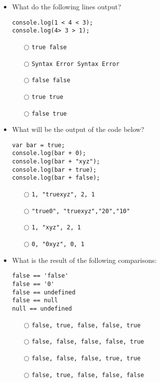 \documentclass[10pt,twocolumn]{article}
\begin{document}
\begin{itemize}
    \item What do the following lines output?
          \begin{verbatim}
console.log(1 < 4 < 3);
console.log(4> 3 > 1);
\end{verbatim}
          \begin{itemize}
              \item[$\bigcirc$] \verb=true false=
              \item[$\bigcirc$] \verb=Syntax Error Syntax Error=
              \item[$\bigcirc$] \verb=false false=
              \item[$\bigcirc$] \verb=true true=
              \item[$\bigcirc$] \verb=false true=
          \end{itemize}
\end{itemize}
\begin{itemize}
    \item What will be the output of the code below?
          \begin{verbatim}
var bar = true;
console.log(bar + 0);
console.log(bar + "xyz");
console.log(bar + true);
console.log(bar + false);
\end{verbatim}
          \begin{itemize}
              \item[$\bigcirc$] \verb=1, "truexyz", 2, 1=
              \item[$\bigcirc$] \verb="true0", "truexyz","20","10"=
              \item[$\bigcirc$] \verb=1, "xyz", 2, 1=
              \item[$\bigcirc$] \verb=0, "0xyz", 0, 1=
          \end{itemize}
\end{itemize}
\begin{itemize}
    \item What is the result of the following comparisons:
          \begin{verbatim}
false == 'false'
false == '0'
false == undefined
false == null
null == undefined
\end{verbatim}
          \begin{itemize}
              \item[$\bigcirc$] \verb=false, true, false, false, true=
              \item[$\bigcirc$] \verb=false, false, false, false, true=
              \item[$\bigcirc$] \verb=false, false, false, true, true=
              \item[$\bigcirc$] \verb=false, true, false, false, false=
          \end{itemize}
\end{itemize}
\end{document}
